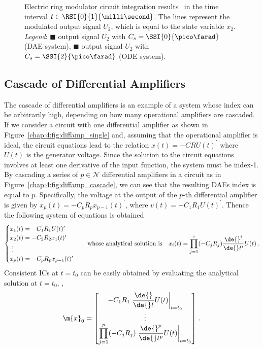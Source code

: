 \begin{figure}[htb]
  \centering
  \small{}
  \caption{Electric ring modulator circuit integration results~\cite{lioen1998test, mazzia2008test} in the time interval $t \in \RSI{0}{1}{\milli\second}$. The lines represent the modulated output signal $U_2$, which is equal to the state variable $x_2$. \emph{Legend}: \textcolor{mycolor1}{$\blacksquare$} output signal $U_2$ with $C_s = \SSI{0}{\pico\farad}$ (\ac{DAE} system), \textcolor{mycolor2}{$\blacksquare$} output signal $U_2$ with $C_s = \SSI{2}{\pico\farad}$ (\ac{ODE} system).}
  \label{chap5:fig:ring_modulator_results}
\end{figure}

\subsection{Cascade of Differential Amplifiers}

The cascade of differential amplifiers is an example of a system whose index can be arbitrarily high, depending on how many operational amplifiers are cascaded. If we consider a circuit with one differential amplifier as shown in Figure~\ref{chap:4:fig:diffamp_single} and, assuming that the operational amplifier is ideal, the circuit equations lead to the relation $x(t) = -C R U(t)^{\prime}$ where $U(t)$ is the generator voltage. Since the solution to the circuit equations involves at least one derivative of the input function, the system must be index-1. By cascading a series of $p \in \mathcal{N}$ differential amplifiers in a circuit as in Figure~\ref{chap:4:fig:diffamp_cascade}, we can see that the resulting \acp{DAE} index is equal to $p$. Specifically, the voltage at the output of the $p$-th differential amplifier is given by $x_p(t) = -C_p R_p x_{p-1}(t)^{\prime}$, where $v(t) = -C_1 R_1 U(t)^{\prime}$. Thence the following system of equations is obtained
%
\begin{equation*}
  \begin{cases}
    x_1(t) = -C_1 R_1 U(t)^{\prime} \\
    x_2(t) = -C_2 R_2 x_1(t)^{\prime} \\
    ~\vdots \\
    x_p(t) = -C_p R_p x_{p-1}(t)^{\prime}
  \end{cases}
  \quad \text{whose analytical solution is} \quad
  x_i(t) = \prod_{j=1}^{i} (-C_j R_j) \dfrac{\de{}^{i}}{\de{}t^{i}}U(t) \, \text{.}
\end{equation*}
%
Consistent \acp{IC} at $t = t_0$ can be easily obtained by evaluating the analytical solution at $t = t_0$, \ie{},
%
\begin{equation*}
  \m{x}_0 = \begin{bmatrix}
    -C_1 R_1 \left.\dfrac{\de{}}{\de{}t}U(t)\right|_{t=t_0} \\
    \vdots \\
    \displaystyle\prod_{j=1}^{p} (-C_j R_j) \left.\dfrac{\de{}^{p}}{\de{}t^{p}}U(t)\right|_{t=t_0}
  \end{bmatrix} \, \text{.}
\end{equation*}

